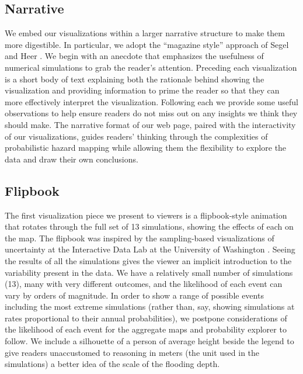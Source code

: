 \documentclass{vgtc}                          %
\begin{document}
\subsection{Narrative}
We embed our visualizations within a larger narrative structure to make them more digestible. In particular, we adopt the ``magazine style'' approach of Segel and Heer \cite{segel2010narrative}. We begin with an anecdote that emphasizes the usefulness of numerical simulations to grab the reader's attention. Preceding each visualization is a short body of text explaining both the rationale behind showing the visualization and providing information to prime the reader so that they can more effectively interpret the visualization. Following each we provide some useful observations to help ensure readers do not miss out on any insights we think they should make. The narrative format of our web page, paired with the interactivity of our visualizations, guides readers' thinking through the complexities of probabilistic hazard mapping while allowing them the flexibility to explore the data and draw their own conclusions.

\subsection{Flipbook}\label{sec:flipbook}
The first visualization piece we present to viewers is a flipbook-style animation that rotates through the full set of 13 simulations, showing the effects of each on the map. The flipbook was inspired by the sampling-based visualizations of uncertainty at the Interactive Data Lab at the University of Washington \cite{hullman2018imagining}. Seeing the results of all the simulations gives the viewer an implicit introduction to the variability present in the data. We have a relatively small number of simulations (13), many with very different outcomes, and the likelihood of each event can vary by orders of magnitude. In order to show a range of possible events including the most extreme simulations (rather than, say, showing simulations at rates proportional to their annual probabilities), we postpone considerations of the likelihood of each event for the aggregate maps and probability explorer to follow. We include a silhouette of a person of average height beside the legend to give readers unaccustomed to reasoning in meters (the unit used in the simulations) a better idea of the scale of the flooding depth.
\end{document}
